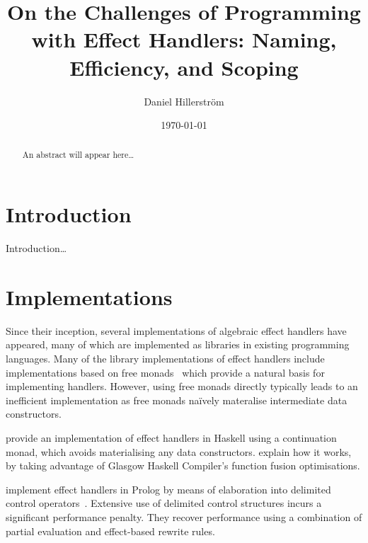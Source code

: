 \documentclass[a4paper,twoside,10pt]{amsart}
\title{On the Challenges of Programming with Effect Handlers:
  Naming, Efficiency, and Scoping}
\author[D. Hillerström]{Daniel Hillerström}
\date{\today}
\begin{document}
\maketitle


\begin{abstract}
An abstract will appear here\dots
\end{abstract}

\tableofcontents

\section{Introduction}
Introduction\dots

\section{Implementations}
Since their inception, several implementations of algebraic effect
handlers have appeared, many of which are implemented as libraries in
existing programming languages.
%
%
Many of the library implementations of effect handlers include
implementations based on free monads~\cite{KammarLO13, KiselyovSS13,
  KiselyovI15, Brady13, WuSH14} which provide a natural basis for
implementing handlers. However, using free monads directly typically
leads to an inefficient implementation as free monads naïvely
materalise intermediate data constructors.

\citet{KammarLO13} provide an implementation of effect handlers in
Haskell using a continuation monad, which avoids materialising any
data constructors. \citet{WuS15} explain how it works, by taking
advantage of Glasgow Haskell Compiler's function fusion
optimisations.

\citet{SalehS16} implement effect handlers in Prolog by means of
elaboration into delimited control
operators~\cite{SchrijversDDW13}. Extensive use of delimited control
structures incurs a significant performance penalty. They recover
performance using a combination of partial evaluation and effect-based
rewrite rules.
\end{document}
